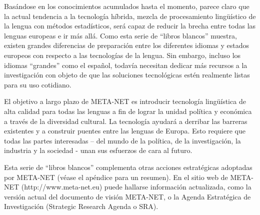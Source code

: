\begin{multicols}{2}
  
  Basándose en los conocimientos acumulados hasta el momento, parece claro que la actual tendencia a la tecnología híbrida, mezcla de procesamiento lingüístico de la lengua con métodos estadísticos, será capaz de reducir la brecha entre todas las lenguas europeas e ir más allá. Como esta serie de “libros blancos” muestra, existen grandes diferencias de preparación entre los diferentes idiomas y estados europeos con respecto a las tecnologías de la lengua. Sin embargo, incluso los idiomas “grandes” como el español, todavía necesitan dedicar más recursos a la investigación con objeto de que las soluciones tecnológicas estén realmente listas para su uso cotidiano. 

  El objetivo a largo plazo de META-NET es introducir tecnología lingüística de alta calidad para todas las lenguas a fin de lograr la unidad política y económica a través de la diversidad cultural. La tecnología ayudará a derribar las barreras existentes y a construir puentes entre las lenguas de Europa. Esto requiere que todas las partes interesadas – del mundo de la política, de la investigación, la industria y la sociedad - unan sus esfuerzos de cara al futuro.
  
  Esta serie de “libros blancos” complementa otras acciones estratégicas adoptadas por META-NET (véase el apéndice para un resumen). En el sitio web de META-NET  (http://www.meta-net.eu) puede hallarse información actualizada, como la versión actual del documento de visión META-NET, o la Agenda Estratégica de Investigación (Strategic Research Agenda o SRA).
  
\end{multicols}

\clearpage



